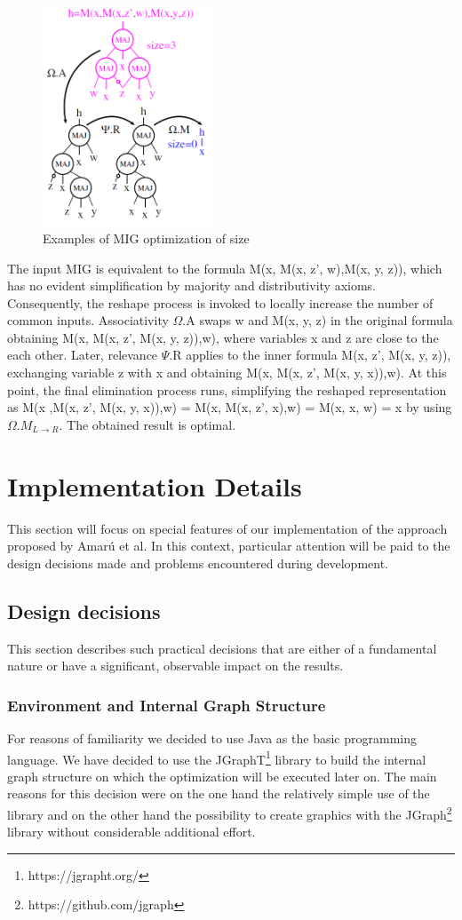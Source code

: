 \documentclass[
	accentcolor=1c,%
	type=intern,
	marginpar=false,
	ruledheaders=section,
	class=report,
	BCOR=5mm,
      parskip=half-,
	fontsize=10pt
	]{tudapub}
\begin{document}
	\begin{figure}
			\includegraphics [width=2in]{example_size.png}
			\caption{Examples of MIG optimization of size}
	\end{figure}
	The input MIG is equivalent to the formula M(x, M(x, z', w),M(x, y, z)), which has no evident simplification by majority and distributivity axioms. Consequently, the reshape process is invoked to locally increase the number of common inputs. Associativity $\Omega$.A swaps w and M(x, y, z) in the original formula obtaining M(x, M(x, z', M(x, y, z)),w), where variables x and z are close to the each other. Later, relevance $\Psi$.R applies to the inner formula M(x, z', M(x, y, z)), exchanging variable z with x and obtaining M(x, M(x, z', M(x, y, x)),w). At this point, the final elimination process runs, simplifying the reshaped representation as M(x ,M(x, z', M(x, y, x)),w) = M(x, M(x, z', x),w) = M(x, x, w) = x by using $\Omega.M_{L\rightarrow R}$. The obtained result is optimal.


	\section{Implementation Details}
	This section will focus on special features of our implementation of the approach proposed by Amarú et al.
	In this context, particular attention will be paid to the design decisions made and problems encountered during development.
	\subsection{Design decisions}
	This section describes such practical decisions that are either of a fundamental nature or have a significant, observable impact on the results.
		\subsubsection{Environment and Internal Graph Structure}
			For reasons of familiarity we decided to use Java as the basic programming language.
			We have decided to use the JGraphT\footnote{https://jgrapht.org/} library to build the internal graph structure on which the optimization will be executed later on.
			The main reasons for this decision were on the one hand the relatively simple use of the library and on the other hand the possibility to create graphics with the JGraph\footnote{https://github.com/jgraph} library without considerable additional effort.
\end{document}
